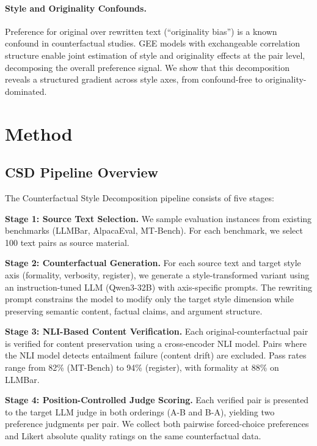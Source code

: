 \documentclass[10pt,twocolumn]{article}
\begin{document}
\paragraph{Style and Originality Confounds.}
Preference for original over rewritten text (``originality bias'') is a known confound in counterfactual studies.
GEE models \citep{liang1986} with exchangeable correlation structure enable joint estimation of style and originality effects at the pair level, decomposing the overall preference signal.
We show that this decomposition reveals a structured gradient across style axes, from confound-free to originality-dominated.

\section{Method}\label{sec:method}

\subsection{CSD Pipeline Overview}

The Counterfactual Style Decomposition pipeline consists of five stages:

\textbf{Stage 1: Source Text Selection.}
We sample evaluation instances from existing benchmarks (LLMBar, AlpacaEval, MT-Bench).
For each benchmark, we select 100 text pairs as source material.

\textbf{Stage 2: Counterfactual Generation.}
For each source text and target style axis (formality, verbosity, register), we generate a style-transformed variant using an instruction-tuned LLM (Qwen3-32B) with axis-specific prompts.
The rewriting prompt constrains the model to modify only the target style dimension while preserving semantic content, factual claims, and argument structure.

\textbf{Stage 3: NLI-Based Content Verification.}
Each original-counterfactual pair is verified for content preservation using a cross-encoder NLI model.
Pairs where the NLI model detects entailment failure (content drift) are excluded.
Pass rates range from 82\% (MT-Bench) to 94\% (register), with formality at 88\% on LLMBar.

\textbf{Stage 4: Position-Controlled Judge Scoring.}
Each verified pair is presented to the target LLM judge in both orderings (A-B and B-A), yielding two preference judgments per pair.
We collect both pairwise forced-choice preferences and Likert absolute quality ratings on the same counterfactual data.
\end{document}
